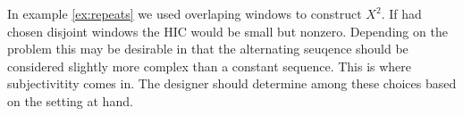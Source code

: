 In example \ref{ex:repeats} we used overlaping windows to construct $X^2$. If
had chosen disjoint windows the HIC would be small but nonzero. Depending on
the problem this may be desirable in that the alternating seuqence should be
considered slightly more complex than a constant sequence. This is where
subjectivitity comes in. The designer should determine among these choices
based on the setting at hand.
